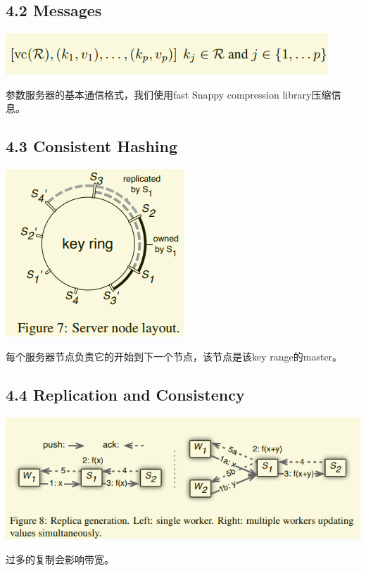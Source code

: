 \documentclass[11pt]{article}
\begin{document}
\subsection{4.2 Messages}
\label{sec:org8b55c7a}
\begin{center}
\includegraphics[width=.9\linewidth]{PS.org_imgs/20201110_190122_KcTtuT.png}
\end{center}
参数服务器的基本通信格式，我们使用fast Snappy compression library压缩信息。
\subsection{4.3 Consistent Hashing}
\label{sec:orgc5a7622}
\begin{center}
\includegraphics[width=.9\linewidth]{PS.org_imgs/20201110_190423_IeaQJ7.png}
\end{center}
每个服务器节点负责它的开始到下一个节点，该节点是该key range的master。
\subsection{4.4 Replication and Consistency}
\label{sec:org907026c}
\begin{center}
\includegraphics[width=.9\linewidth]{PS.org_imgs/20201110_191114_nNFZVT.png}
\end{center}
过多的复制会影响带宽。
\end{document}
